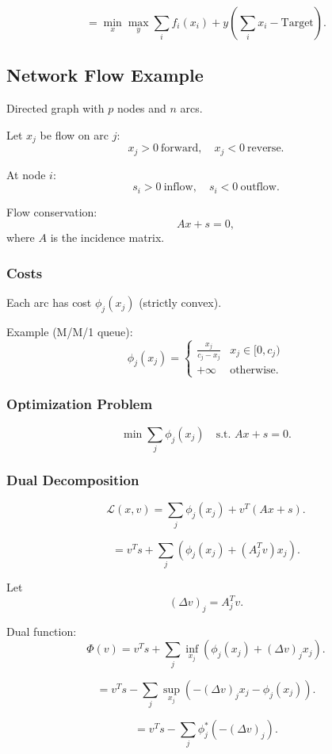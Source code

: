 \documentclass[12pt,oneside]{book}
\numberwithin{equation}{section}
\theoremstyle{definition}
\theoremstyle{plain}
\theoremstyle{remark}
\begin{document}
\[
= \min_x \max_y \sum_i f_i(x_i) + y\left(\sum_i x_i - \text{Target}\right).
\]

\subsection{Network Flow Example}

Directed graph with $p$ nodes and $n$ arcs.

Let $x_j$ be flow on arc $j$:
\[
x_j > 0 \ \text{forward}, \quad x_j < 0 \ \text{reverse}.
\]

At node $i$:
\[
s_i > 0 \ \text{inflow}, \quad s_i < 0 \ \text{outflow}.
\]

Flow conservation:
\[
Ax + s = 0,
\]
where $A$ is the incidence matrix.

\subsubsection*{Costs}

Each arc has cost $\phi_j(x_j)$ (strictly convex).

Example (M/M/1 queue):
\[
\phi_j(x_j) =
\begin{cases}
\frac{x_j}{c_j - x_j} & x_j \in [0,c_j) \\
+\infty & \text{otherwise}.
\end{cases}
\]

\subsubsection*{Optimization Problem}

\[
\min \sum_j \phi_j(x_j)
\quad \text{s.t. } Ax + s = 0.
\]

\subsubsection*{Dual Decomposition}

\[
\mathcal{L}(x,v)
=
\sum_j \phi_j(x_j) + v^T(Ax + s).
\]

\[
= v^T s + \sum_j \left(\phi_j(x_j) + (A_j^T v)x_j \right).
\]

Let
\[
(\Delta v)_j = A_j^T v.
\]

Dual function:
\[
\Phi(v)
=
v^T s + \sum_j \inf_{x_j} \left(\phi_j(x_j) + (\Delta v)_j x_j \right).
\]

\[
=
v^T s - \sum_j \sup_{x_j} \left( -(\Delta v)_j x_j - \phi_j(x_j) \right).
\]

\[
=
v^T s - \sum_j \phi_j^*(-(\Delta v)_j).
\]
\end{document}
